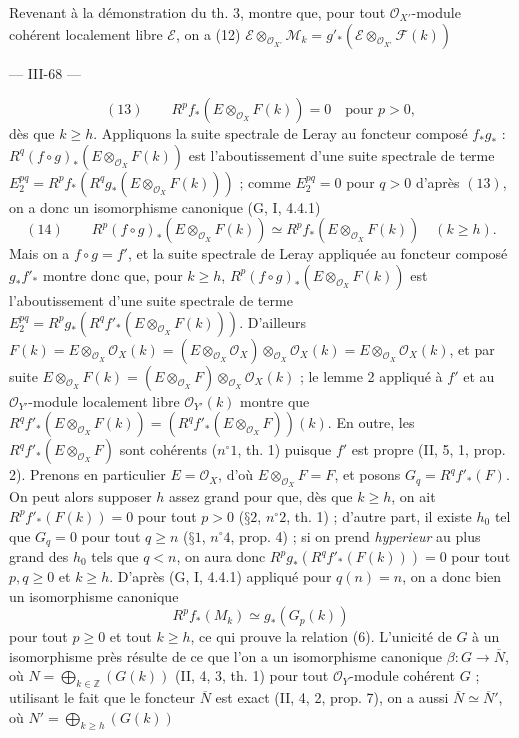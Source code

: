Revenant à la démonstration du th. 3,  montre que, pour tout $\mathcal{O}_{X'}$-module cohérent localement libre $\mathcal{E}$, on a
(12) $\mathcal{E} \otimes_{\mathcal{O}_{X'}} \mathcal{M}_k = g'_* (\mathcal{E} \otimes_{\mathcal{O}_{X'}} \mathcal{F}(k))$

\newpage


--- III-68 ---

$$(13) \qquad R^p f_* (E \otimes_{\mathcal{O}_X} F(k)) = 0 \quad \text{pour } p > 0,$$
dès que $k \ge h$. Appliquons la suite spectrale de Leray au foncteur composé $f_* g_*$ : $R^q (f \circ g)_* (E \otimes_{\mathcal{O}_X} F(k))$ est l'aboutissement d'une suite spectrale de terme $E_2^{pq} = R^p f_* (R^q g_* (E \otimes_{\mathcal{O}_X} F(k)))$ ; comme $E_2^{pq} = 0$ pour $q > 0$ d'après $(13)$, on a donc un isomorphisme canonique (G, I, 4.4.1)
$$(14) \qquad R^p (f \circ g)_* (E \otimes_{\mathcal{O}_X} F(k)) \simeq R^p f_* (E \otimes_{\mathcal{O}_X} F(k)) \quad (k \ge h).$$
Mais on a $f \circ g = f'$, et la suite spectrale de Leray appliquée au foncteur composé $g_* f'_*$ montre donc que, pour $k \ge h$, $R^p (f \circ g)_* (E \otimes_{\mathcal{O}_X} F(k))$ est l'aboutissement d'une suite spectrale de terme $E_2^{pq} = R^p g_* (R^q f'_* (E \otimes_{\mathcal{O}_X} F(k)))$. D'ailleurs $F(k) = E \otimes_{\mathcal{O}_X} \mathcal{O}_X(k) = (E \otimes_{\mathcal{O}_X} \mathcal{O}_X) \otimes_{\mathcal{O}_X} \mathcal{O}_X(k) = E \otimes_{\mathcal{O}_X} \mathcal{O}_X(k)$, et par suite $E \otimes_{\mathcal{O}_X} F(k) = (E \otimes_{\mathcal{O}_X} F) \otimes_{\mathcal{O}_X} \mathcal{O}_X(k)$ ; le lemme 2 appliqué à $f'$ et au $\mathcal{O}_{Y'}$-module localement libre $\mathcal{O}_{Y'}(k)$ montre que $R^q f'_* (E \otimes_{\mathcal{O}_X} F(k)) = (R^q f'_* (E \otimes_{\mathcal{O}_X} F))(k)$. En outre, les $R^q f'_* (E \otimes_{\mathcal{O}_X} F)$ sont cohérents ($n^\circ 1$, th. 1) puisque $f'$ est propre (II, 5, 1, prop. 2).
Prenons en particulier $E = \mathcal{O}_X$, d'où $E \otimes_{\mathcal{O}_X} F = F$, et posons $G_q = R^q f'_* (F)$. On peut alors supposer $h$ assez grand pour que, dès que $k \ge h$, on ait $R^p f'_* (F(k)) = 0$ pour tout $p > 0$ ($§ 2$, $n^\circ 2$, th. 1) ; d'autre part, il existe $h_0$ tel que $G_q = 0$ pour tout $q \ge n$ ($§ 1$, $n^\circ 4$, prop. 4) ; si on prend \emph{hyperieur} au plus grand des $h_0$ tels que $q < n$, on aura donc $R^p g_* (R^q f'_* (F(k))) = 0$ pour tout $p, q \ge 0$ et $k \ge h$.
D'après (G, I, 4.4.1) appliqué pour $q(n) = n$, on a donc bien un isomorphisme canonique
$$R^p f_* (M_k) \simeq g_* (G_p(k))$$
pour tout $p \ge 0$ et tout $k \ge h$, ce qui prouve la relation (6). L'unicité de $G$ à un isomorphisme près résulte de ce que l'on a un isomorphisme canonique $\beta : G \to \overline{N}$, où $N = \bigoplus_{k \in \mathbb{Z}} (G(k))$ (II, 4, 3, th. 1) pour tout $\mathcal{O}_Y$-module cohérent $G$ ; utilisant le fait que le foncteur $\overline{N}$ est exact (II, 4, 2, prop. 7), on a aussi $\overline{N} \simeq \overline{N}'$, où $N' = \bigoplus_{k \ge h} (G(k))$

